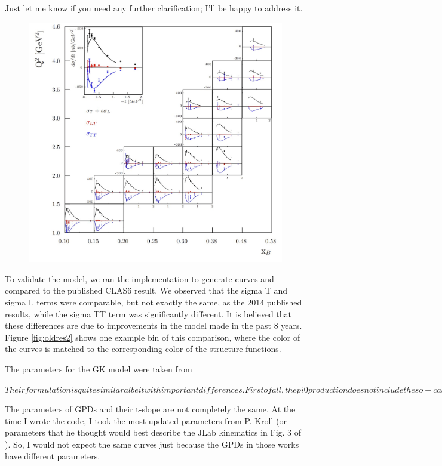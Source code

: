 Just let me know if you need any further clarification; I'll be happy to address it.







\begin{figure}[hbt]
	\centering
	\includegraphics[page=6,width=0.6\linewidth]{Chapters/Ch5-FurtherAnalysis/pics/clas6comp.jpg}
\end{figure}\label{fig:oldres}

To validate the model, we ran the implementation to generate curves and compared to the published CLAS6 result. We observed that the sigma T and sigma L terms were comparable, but not exactly the same, as the 2014 published results, while the sigma TT term was significantly different. It is believed that these differences are due to improvements in the model made in the past 8 years. Figure \ref{fig:oldres2} shows one example bin of this comparison, where the color of the curves is matched to the corresponding color of the structure functions.


The parameters for the GK model were taken from 

$
Their formulation is quite similar albeit with important differences. First of all, the pi0 production does not include the so-called pion-pole contribution (see Eq. 4.39 - 4.42 in my thesis). Moreover, their handbag contributions are slightly different. Their differences at the handbag level are discussed in Eq. 4.37 and 4.38 in my thesis. $

The parameters of GPDs and their t-slope are not completely the same. At the time I wrote the code, I took the most updated parameters from P. Kroll (or parameters that he thought would best describe the JLab kinematics in Fig. 3 of \cite{Diehl2020ExtractionKinematics} ). So, I would not expect the same curves just because the GPDs in those works have different parameters. 

